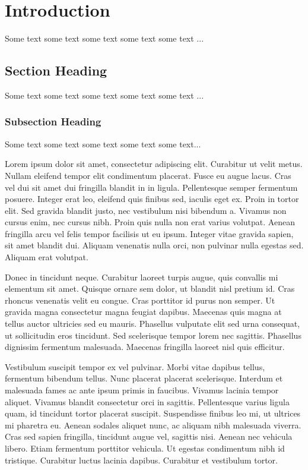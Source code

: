 \chapter{Introduction}
\label{intro}



Some text some text some text some text some text \citep{article}... 


\section{Section Heading}

Some text some text some text some text some text \citep{book}... 

  
\subsection{Subsection Heading}

Some text some text some text some text some text...

Lorem ipsum dolor sit amet, consectetur adipiscing elit. Curabitur ut velit metus. Nullam eleifend tempor elit condimentum placerat. Fusce eu augue lacus. Cras vel dui sit amet dui fringilla blandit in in ligula. Pellentesque semper fermentum posuere. Integer erat leo, eleifend quis finibus sed, iaculis eget ex. Proin in tortor elit. Sed gravida blandit justo, nec vestibulum nisi bibendum a. Vivamus non cursus enim, nec cursus nibh. Proin quis nulla non erat varius volutpat. Aenean fringilla arcu vel felis tempor facilisis ut eu ipsum. Integer vitae gravida sapien, sit amet blandit dui. Aliquam venenatis nulla orci, non pulvinar nulla egestas sed. Aliquam erat volutpat.

Donec in tincidunt neque. Curabitur laoreet turpis augue, quis convallis mi elementum sit amet. Quisque ornare sem dolor, ut blandit nisl pretium id. Cras rhoncus venenatis velit eu congue. Cras porttitor id purus non semper. Ut gravida magna consectetur magna feugiat dapibus. Maecenas quis magna at tellus auctor ultricies sed eu mauris. Phasellus vulputate elit sed urna consequat, ut sollicitudin eros tincidunt. Sed scelerisque tempor lorem nec sagittis. Phasellus dignissim fermentum malesuada. Maecenas fringilla laoreet nisl quis efficitur.

Vestibulum suscipit tempor ex vel pulvinar. Morbi vitae dapibus tellus, fermentum bibendum tellus. Nunc placerat placerat scelerisque. Interdum et malesuada fames ac ante ipsum primis in faucibus. Vivamus lacinia tempor aliquet. Vivamus blandit consectetur orci in sagittis. Pellentesque varius ligula quam, id tincidunt tortor placerat suscipit. Suspendisse finibus leo mi, ut ultrices mi pharetra eu. Aenean sodales aliquet nunc, ac aliquam nibh malesuada viverra. Cras sed sapien fringilla, tincidunt augue vel, sagittis nisi. Aenean nec vehicula libero. Etiam fermentum porttitor vehicula. Ut egestas condimentum nibh id tristique. Curabitur luctus lacinia dapibus. Curabitur et vestibulum tortor.

